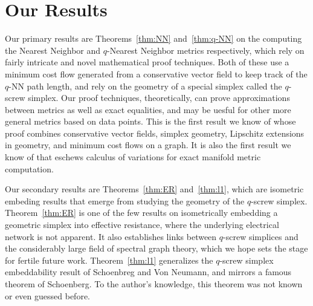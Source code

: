 \section{Our Results}
Our primary results are Theorems~\ref{thm:NN} and~\ref{thm:q-NN} on the
computing the Nearest Neighbor and $q$-Nearest Neighbor metrics
respectively, which rely
on fairly intricate and novel mathematical proof techniques. Both of these
use a minimum cost flow generated from a conservative vector field to keep
track of the $q$-NN path length, and rely on the geometry of a special
simplex called the
$q$-screw simplex. Our proof techniques, theoretically, can prove
approximations between metrics as well as exact equalities, and may be
uesful for other more general metrics based on data points. This is the
first result we know of whose proof combines
conservative vector fields, simplex geometry, Lipschitz extensions in
geometry, and minimum cost flows on a graph. It is also the first result we
know of that eschews calculus of variations for exact manifold metric
computation.

Our secondary results are Theorems~\ref{thm:ER} and~\ref{thm:l1}, which are
isometric embeding results that emerge from studying the geometry of the
$q$-screw simplex. 
Theorem~\ref{thm:ER} is one of the few results on isometrically embedding a
geometric simplex into effective resistance, where the underlying
electrical network is not apparent. It also establishes links between
$q$-screw simplices and the considerably large field of spectral graph theory,
which we hope sets the stage for fertile future work.
Theorem~\ref{thm:l1} generalizes the $q$-screw simplex embeddability result
of Schoenbreg and Von Neumann, and mirrors a famous theorem of Schoenberg.
To the author's knowledge, this theorem was not known or even guessed
before.

